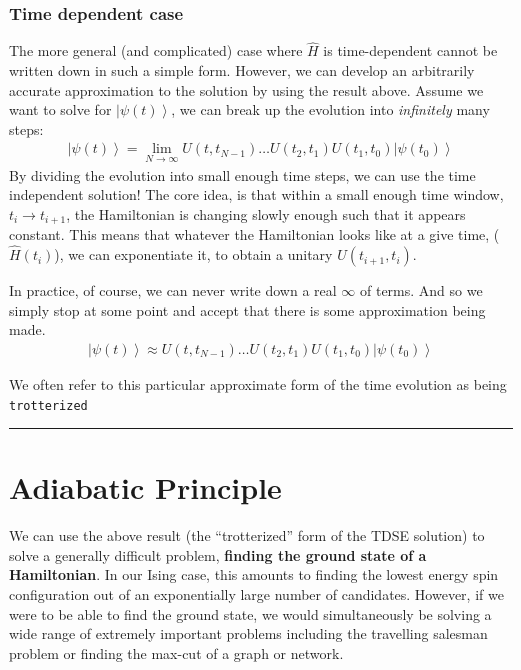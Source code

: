 \documentclass[11pt]{article}
\providecommand{\ket}[1]{\left|#1\right\rangle}
\begin{document}
\subsubsection{Time dependent case}\label{time-dependent-case}

The more general (and complicated) case where \(\hat{H}\) is
time-dependent cannot be written down in such a simple form. However, we
can develop an arbitrarily accurate approximation to the solution by
using the result above. Assume we want to solve for \(\ket{\psi(t)}\),
we can break up the evolution into \emph{infinitely} many steps:
\[\begin{align}
\ket{\psi(t)} = \lim_{N\rightarrow \infty} U(t,t_{N-1})\dots U(t_2,t_1) U(t_1,t_0)\ket{\psi(t_0)}
\end{align}\] By dividing the evolution into small enough time steps, we
can use the time independent solution! The core idea, is that within a
small enough time window, \(t_i \rightarrow t_{i+1}\), the Hamiltonian
is changing slowly enough such that it appears constant. This means that
whatever the Hamiltonian looks like at a give time, (\(\hat{H}(t_i)\)),
we can exponentiate it, to obtain a unitary \(U(t_{i+1}, t_i)\).

In practice, of course, we can never write down a real \(\infty\) of
terms. And so we simply stop at some point and accept that there is some
approximation being made. \[\begin{align}
\ket{\psi(t)} \approx   U(t,t_{N-1})\dots U(t_2,t_1) U(t_1,t_0)\ket{\psi(t_0)}
\end{align}\]

We often refer to this particular approximate form of the time evolution
as being \texttt{trotterized}

\begin{center}\rule{0.5\linewidth}{0.5pt}\end{center}

    \section{Adiabatic Principle}\label{adiabatic-principle}

We can use the above result (the ``trotterized'' form of the TDSE
solution) to solve a generally difficult problem, \textbf{finding the
ground state of a Hamiltonian}. In our Ising case, this amounts to
finding the lowest energy spin configuration out of an exponentially
large number of candidates. However, if we were to be able to find the
ground state, we would simultaneously be solving a wide range of
extremely important problems including the travelling salesman problem
or finding the max-cut of a graph or network.
\end{document}
